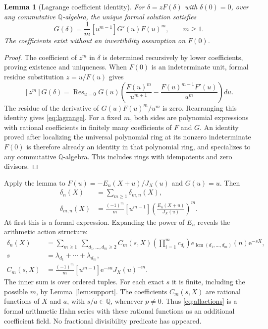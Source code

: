 \documentclass[11pt,a4paper]{article}
\numberwithin{equation}{section}
\newtheorem{lemma}[theorem]{Lemma}
\theoremstyle{definition}
\theoremstyle{remark}
\newcommand{\Q}{\mathbb Q}
\newcommand{\ee}{\mathrm e}
\newcommand{\lcm}{\operatorname{lcm}}
\newcommand{\Res}{\operatorname{Res}}
\begin{document}
\begin{lemma}[Lagrange coefficient identity]\label{lem:lagrange}
For $\delta=zF(\delta)$ with $\delta(0)=0$, over any commutative
$\Q$-algebra, the unique formal solution satisfies
\begin{equation}
 [z^m]G(\delta)=\frac1m[u^{m-1}]G'(u)F(u)^m,
 \qquad m\ge1.
 \label{eq:lagrange}
\end{equation}
The coefficients exist without an invertibility assumption on $F(0)$.
\end{lemma}
\begin{proof}
The coefficient of $z^m$ in $\delta$ is determined recursively by lower
coefficients, proving existence and uniqueness. When $F(0)$ is an
indeterminate unit, formal residue substitution $z=u/F(u)$ gives
\[
 [z^m]G(\delta)
 =\Res_{u=0}G(u)\left(\frac{F(u)^m}{u^{m+1}}
       -\frac{F(u)^{m-1}F'(u)}{u^m}\right)du.
\]
The residue of the derivative of $G(u)F(u)^m/u^m$ is zero.
Rearranging this identity gives \eqref{eq:lagrange}. For a fixed $m$,
both sides are polynomial expressions with rational coefficients in
finitely many coefficients of $F$ and $G$. An identity proved after
localizing the universal polynomial ring at its nonzero indeterminate
$F(0)$ is therefore already an identity in that polynomial ring, and
specializes to any commutative $\Q$-algebra. This includes rings with
idempotents and zero divisors.
\end{proof}

Apply the lemma to $F(u)=-E_n(X+u)/J_X(u)$ and $G(u)=u$. Then
\begin{align}
 \delta_n(X)&=\sum_{m\ge1}\delta_{m,n}(X),\label{eq:deltasum}\\
 \delta_{m,n}(X)
 &=\frac{(-1)^m}{m}[u^{m-1}]
       \left(\frac{E_n(X+u)}{J_X(u)}\right)^m.
 \label{eq:deltam}
\end{align}
At first this is a formal expression. Expanding the power of $E_n$
reveals the arithmetic action structure:
\begin{align}
 \delta_n(X)
 &=\sum_{m\ge1}\ \sum_{d_1,\ldots,d_m\ge2}
 C_m(s,X)\left(\prod_{i=1}^m c_{d_i}\right)
 e_{\lcm(d_1,\ldots,d_m)}(n)\ee^{-sX},\label{eq:allactions}\\
 s&=\lambda_{d_1}+\cdots+\lambda_{d_m},\nonumber\\
 C_m(s,X)&=\frac{(-1)^m}{m}[u^{m-1}]\ee^{-su}J_X(u)^{-m}.
 \label{eq:Cm}
\end{align}
The inner sum is over ordered tuples. For each exact $s$ it is finite,
including the possible $m$, by Lemma~\ref{lem:support}. The coefficients
$C_m(s,X)$ are rational functions of $X$ and $a$, with $s/a\in\Q$,
whenever $p\ne0$. Thus \eqref{eq:allactions} is a formal arithmetic
Hahn series with these rational functions as an additional coefficient
field. No fractional divisibility predicate has appeared.
\end{document}
